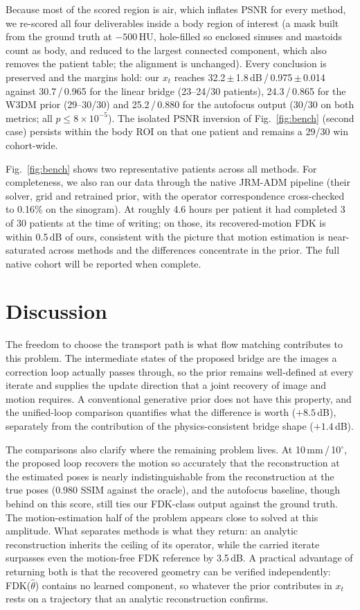 \documentclass[11pt]{article}
\newcommand{\thetahat}{\hat\theta}
\begin{document}
Because most of the scored region is air, which inflates PSNR for every method, we
re-scored all four deliverables inside a body region of interest (a mask built from the
ground truth at $-500$\,HU, hole-filled so enclosed sinuses and mastoids count as body, and
reduced to the largest connected component, which also removes the patient table; the
alignment is unchanged). Every conclusion is preserved and the margins hold: our $x_t$
reaches 32.2\,$\pm$\,1.8\,dB\,/\,0.975\,$\pm$\,0.014 against 30.7\,/\,0.965 for the linear
bridge (23--24/30 patients), 24.3\,/\,0.865 for the W3DM prior (29--30/30) and
25.2\,/\,0.880 for the autofocus output (30/30 on both metrics; all $p \le 8\times10^{-5}$).
The isolated PSNR inversion of Fig.~\ref{fig:bench} (second case) persists within the body
ROI on that one patient and remains a 29/30 win cohort-wide.

Fig.~\ref{fig:bench} shows two representative patients across all methods. For completeness, we
also ran our data through the native JRM-ADM pipeline (their solver, grid and retrained
prior, with the operator correspondence cross-checked to 0.16\% on the sinogram). At roughly
4.6 hours per patient it had completed 3 of 30 patients at the time of writing; on those, its
recovered-motion FDK is within 0.5\,dB of ours, consistent with the picture that motion
estimation is near-saturated across methods and the differences concentrate in the prior. The
full native cohort will be reported when complete.

\section{Discussion}
\label{sec:discussion}

The freedom to choose the transport path is what flow matching contributes to this problem.
The intermediate states of the proposed bridge are the images a correction loop actually
passes through, so the prior remains well-defined at every iterate and supplies the update
direction that a joint recovery of image and motion requires. A conventional generative prior
does not have this property, and the unified-loop comparison quantifies what the difference
is worth ($+8.5$\,dB), separately from the contribution of the physics-consistent bridge
shape ($+1.4$\,dB).

The comparisons also clarify where the remaining problem lives. At 10\,mm\,/\,10$^\circ$,
the proposed loop recovers the motion so accurately that the reconstruction at the estimated
poses is nearly indistinguishable from the reconstruction at the true poses (0.980 SSIM
against the oracle), and the autofocus baseline, though behind on this score, still ties our
FDK-class output against the ground truth. The motion-estimation half of the problem appears
close to solved at this amplitude. What separates methods is what they return: an analytic
reconstruction inherits the ceiling of its operator, while the carried iterate surpasses even
the motion-free FDK reference by 3.5\,dB. A practical advantage of returning both is that the
recovered geometry can be verified independently: FDK($\thetahat$) contains no learned
component, so whatever the prior contributes in $x_t$ rests on a trajectory that an analytic
reconstruction confirms.
\end{document}
